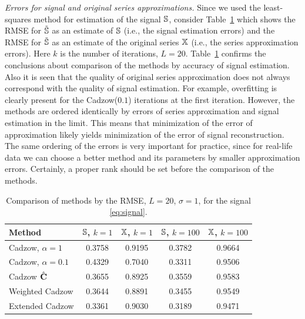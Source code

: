 \documentclass[sii]{ipart}
\begin{document}
\smallskip
\textit{Errors for signal and original series approximations.} Since we used the least-squares method for estimation of the signal $\mathbb{S}$, consider Table~\ref{fintable} which shows the RMSE for $\tilde {\mathbb{S}}$ as an estimate of $\mathbb{S}$ (i.e., the signal estimation errors) and the RMSE for $\tilde {\mathbb{S}}$ as an estimate of the original series $\mathbb{X}$ (i.e., the series approximation errors). Here $k$ is the number of iterations, $L=20$. Table~\ref{fintable} confirms the conclusions about comparison of the methods by accuracy of signal estimation. Also it is seen that the quality of original series approximation does not always correspond with the quality of signal estimation. For example, overfitting is clearly present for the Cadzow($0.1$) iterations at the first iteration. However, the methods are ordered identically by errors of series approximation and signal estimation in the limit. This means that minimization of the error of approximation likely yields minimization of the error of signal reconstruction.
The same ordering of the errors is very important for practice, since for real-life data we can choose a better method and its parameters by smaller approximation errors.
Certainly, a proper rank should be set before the comparison of the methods.

\begin{table}
		\caption{Comparison of methods by the RMSE, $L = 20$, $\sigma=1$, for the signal \eqref{eq:signal}.}\label{fintable}

		\begin{tabular*}{\textwidth}{@{\extracolsep{\fill}}lcccc}
			\hline
			Method & $\mathbb{S}$, $k = 1$ & $\mathbb{X}$, $k = 1$ & $\mathbb{S}$, $k = 100$ & $\mathbb{X}$, $k = 100$  \\
			\hline
			Cadzow, $\alpha = 1$ & 0.3758 & 0.9195 & 0.3782 & 0.9664 \\
			\hline
			Cadzow, $\alpha = 0.1$ & 0.4329 & 0.7040 & 0.3311 & 0.9506 \\
			\hline
			Cadzow $\hat{\mathbf{C}}$ & 0.3655 & 0.8925 & 0.3559 & 0.9583 \\
			\hline
			Weighted Cadzow & 0.3644 & 0.8891 & 0.3455 & 0.9549 \\
			\hline
			Extended Cadzow & 0.3361 & 0.9030 & 0.3189 & 0.9471 \\
			\hline
		\end{tabular*}
\end{table}
\end{document}
